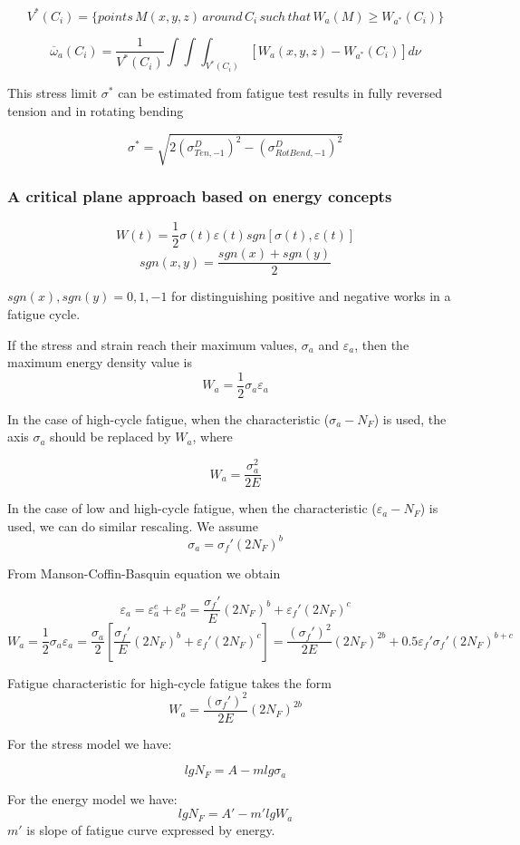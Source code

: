 \documentclass[3p,times,procedia,number]{elsarticle}
\begin{document}
$$V^*(C_i)=\lbrace points\, M(x,y,z) \,around\, C_i \,such\, that \,W_a(M)\geqslant W_{a^*}(C_i) \rbrace$$

$$\overline{\omega}_a(C_i)=\frac{1}{V^*(C_i)}\int\int\int_{V^*(C_i)}^{}[W_a(x,y,z)-W_{a^*}(C_i)]d\nu$$

This stress limit $\sigma^*$ can be estimated from
fatigue test results in fully reversed tension and in rotating
bending

$$\sigma^*=\sqrt{2(\sigma_{Ten,-1}^D)^2-(\sigma_{RotBend,-1}^D)^2}$$


\subsubsection{A critical plane approach based on energy concepts}
$$W(t)=\frac{1}{2}\sigma(t)\varepsilon(t)sgn[\sigma(t),\varepsilon(t)]$$
$$sgn(x,y)=\frac{sgn(x)+sgn(y)}{2}$$

$sgn(x),sgn(y)=0,1,-1$ for distinguishing positive and negative works in a
fatigue cycle\cite{lagoda1999critical}.

If the stress and strain reach their maximum values,
$\sigma_a$ and $\varepsilon_a$, then the maximum energy density value is
$$W_a=\frac{1}{2}\sigma_a\varepsilon_a$$

In the case of high-cycle fatigue,
when the characteristic ($\sigma_a-N_F$) is used, the axis $\sigma_a$
should be replaced by $W_a$, where

$$W_a=\frac{\sigma_a^2}{2E}$$

In the case of low and high-cycle fatigue, when the
characteristic ($\varepsilon_a-N_F$) is used, we can do similar rescaling. We assume $$\sigma_a=\sigma_f'(2N_F)^b$$

From Manson-Coffin-Basquin equation we obtain

$$\varepsilon_a=\varepsilon_a^e+\varepsilon_a^p=\frac{\sigma_f'}{E}(2N_F)^b+\varepsilon_f'(2N_F)^c$$
$$W_a=\frac{1}{2}\sigma_a\varepsilon_a=\frac{\sigma_a}{2}\left[\frac{\sigma_f'}{E}(2N_F)^b+\varepsilon_f'(2N_F)^c\right]=\frac{(\sigma_f')^2}{2E}(2N_F)^{2b}+0.5\varepsilon_f'\sigma_f'(2N_F)^{b+c}$$

Fatigue characteristic for high-cycle fatigue
takes the form
$$W_a=\frac{(\sigma_f')^2}{2E}(2N_F)^{2b}$$

For the stress model we have:

$$lgN_F=A-mlg\sigma_a$$

For the energy model we have:
$$lgN_F=A'-m'lgW_a$$
$m'$ is slope of fatigue curve
expressed by energy.
\end{document}
